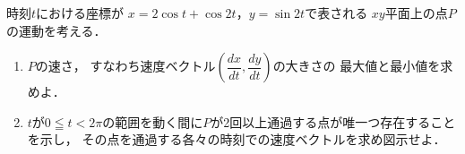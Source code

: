 \documentclass[../../main.tex]{subfiles}
\begin{document}
時刻$t$における座標が
$x=2\cos t+\cos 2t$，$y=\sin 2t$で表される
$xy$平面上の点$P$の運動を考える．
\begin{enumerate}
  \item $P$の速さ，
    すなわち速度ベクトル$\displaystyle \left( \dfrac{dx}{dt},\dfrac{dy}{dt} \right)$の大きさの
    最大値と最小値を求めよ．
  \item $t$が$0 \leqq t < 2\pi$の範囲を動く間に$P$が2回以上通過する点が唯一つ存在することを示し，
    その点を通過する各々の時刻での速度ベクトルを求め図示せよ．
\end{enumerate}
\end{document}
